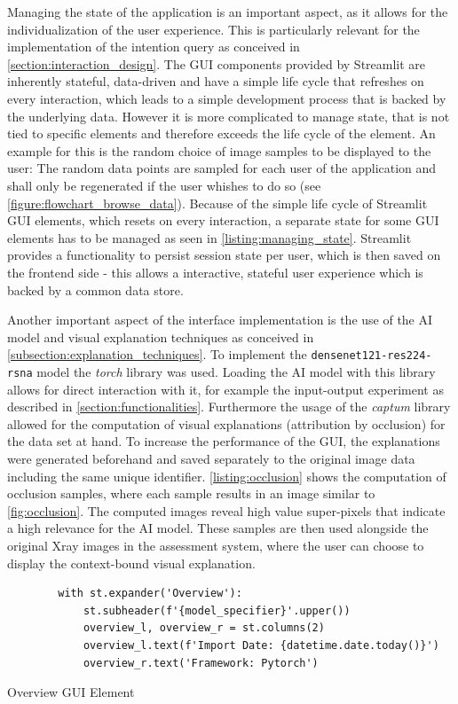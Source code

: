 \documentclass[11pt,a4paper,english]{scrreprt}
\begin{document}
Managing the state of the application is an important aspect, as it allows for the individualization of the user experience. This is particularly relevant for the implementation of the intention query as conceived in \autoref{section:interaction_design}. The GUI components provided by Streamlit are inherently stateful, data-driven and have a simple life cycle that refreshes on every interaction, which leads to a simple development process that is backed by the underlying data. However it is more complicated to manage state, that is not tied to specific elements and therefore exceeds the life cycle of the element. An example for this is the random choice of image samples to be displayed to the user: The random data points are sampled for each user of the application and shall only be regenerated if the user whishes to do so (see \autoref{figure:flowchart_browse_data}). Because of the simple life cycle of Streamlit GUI elements, which resets on every interaction, a separate state for some GUI elements has to be managed as seen in \autoref{listing:managing_state}. Streamlit provides a functionality to persist session state per user, which is then saved on the frontend side - this allows a interactive, stateful user experience which is backed by a common data store.

Another important aspect of the interface implementation is the use of the AI model and visual explanation techniques as conceived in \autoref{subsection:explanation_techniques}. To implement the \texttt{densenet121-res224-rsna} model the \textit{torch} library was used. Loading the AI model with this library allows for direct interaction with it, for example the input-output experiment as described in \autoref{section:functionalities}. Furthermore the usage of the \textit{captum} library allowed for the computation of visual explanations (attribution by occlusion) for the data set at hand. To increase the performance of the GUI, the explanations were generated beforehand and saved separately to the original image data including the same unique identifier. \autoref{listing:occlusion} shows the computation of occlusion samples, where each sample results in an image similar to \autoref{fig:occlusion}. The computed images reveal high value super-pixels that indicate a high relevance for the AI model. These samples are then used alongside the original Xray images in the assessment system, where the user can choose to display the context-bound visual explanation.

\begin{listing}[htpb]
    \begin{verbatim}
        with st.expander('Overview'):
            st.subheader(f'{model_specifier}'.upper())
            overview_l, overview_r = st.columns(2)
            overview_l.text(f'Import Date: {datetime.date.today()}')
            overview_r.text('Framework: Pytorch')
    \end{verbatim}
    \caption{Overview GUI Element}
    \label{listing:overview_element}
\end{listing}
\end{document}
